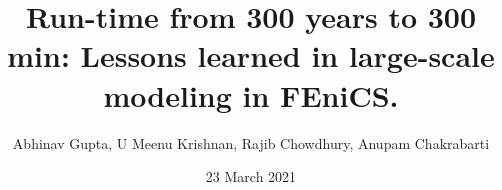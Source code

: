 \title[{\sc 300 Years to 300 min } \hspace{0.8cm} \insertframenumber/\inserttotalframenumber]{{\sc Run-time from 300 years to 300 min: Lessons learned in large-scale modeling in FEniCS.}}
\author[FENICS 2021 --- {\sc March 23\superscript{rd}, 2021}]{{Abhinav Gupta}, U Meenu Krishnan, Rajib Chowdhury, Anupam Chakrabarti}
\date{23 March 2021}
